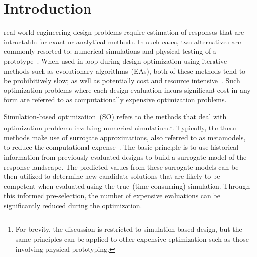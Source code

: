 \section{Introduction}
% 
% 
% 
% 

 real-world engineering design problems require estimation of responses that are intractable for exact or analytical methods. In such cases, two alternatives are commonly resorted to: numerical simulations and physical testing of a prototype~\cite{forrester2008engineering}. When used in-loop during design optimization using iterative methods such as evolutionary algorithms~(EAs), both of these methods tend to be prohibitively slow; as well as potentially cost and resource intensive~\cite{jin2009systems}. Such optimization problems where each design evaluation incurs significant cost in any form are referred to as computationally expensive optimization problems.

Simulation-based optimization~(SO) refers to the methods that deal with optimization problems involving  numerical simulations\footnote{For brevity, the discussion is restricted to simulation-based design, but the same principles can be applied to other expensive optimization such as those involving physical prototyping.}. Typically, the these methods make use of surrogate approximations, also referred to as metamodels, to reduce the computational expense~\cite{amaran2016simulation}. The basic principle is to use historical information from previously evaluated designs to build a surrogate model of the response landscape. The predicted values from these surrogate models can be then utilized to determine new candidate solutions that are likely to be competent when evaluated using the true~(time consuming) simulation. Through this informed pre-selection, the number of expensive evaluations can be significantly reduced during the optimization. 


